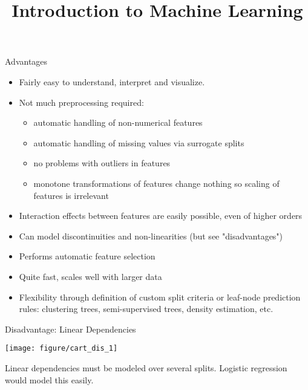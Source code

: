 \documentclass[11pt,compress,t,notes=noshow, xcolor=table]{beamer}
\title{Introduction to Machine Learning}
\institute{\href{https://compstat-lmu.github.io/lecture_i2ml/}{compstat-lmu.github.io/lecture\_i2ml}}
\date{}
\begin{document}

\sloppy

\begin{vbframe}{Advantages}
  \begin{itemize}
    \item Fairly easy to understand, interpret and visualize.
    \item Not much preprocessing required:
    \begin{itemize}
      \item automatic handling of non-numerical features
      \item automatic handling of missing values via surrogate splits
      \item no problems with outliers in features
      \item monotone transformations of features change nothing so scaling of features is irrelevant
    \end{itemize}
    \item Interaction effects between features are easily possible, even of higher orders
    \item Can model discontinuities and non-linearities (but see "disadvantages")
    
    \framebreak
    
    \item Performs automatic feature selection
    \item Quite fast, scales well with larger data
    \item Flexibility through definition of custom split criteria or leaf-node prediction rules: clustering trees, semi-supervised trees, density estimation, etc.
  \end{itemize}
\end{vbframe}

\begin{vbframe}{Disadvantage: Linear Dependencies}
\begin{knitrout}\scriptsize
{}\color{fgcolor}

{\centering \texttt{[image: figure/cart\_dis\_1]} 

}



\end{knitrout}
Linear dependencies must be modeled over several splits. Logistic regression would model this easily.
\end{vbframe}
\end{document}
